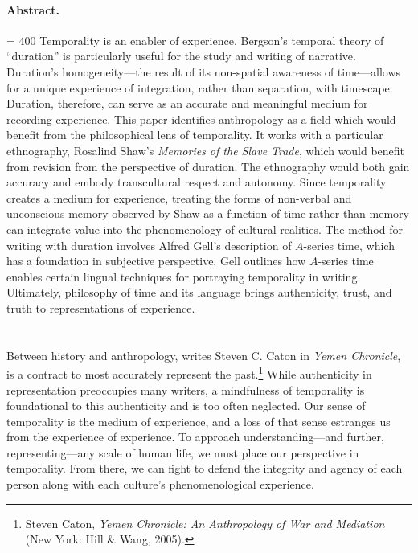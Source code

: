 \paragraph{\small Abstract.}
\pretolerance = 400
{
\small
Temporality is an enabler of experience. Bergson's temporal theory of
``duration'' is particularly useful for the study and writing of
narrative. Duration's homogeneity---the result of its non-spatial
awareness of time---allows for a unique experience of integration,
rather than separation, with timescape. Duration, therefore, can serve
as an accurate and meaningful medium for recording experience. This
paper identifies anthropology as a field which would benefit from the
philosophical lens of temporality. It works with a particular
ethnography, Rosalind Shaw's \emph{Memories of the Slave Trade}, which
would benefit from revision from the perspective of duration. The
ethnography would both gain accuracy and embody transcultural respect
and autonomy. Since temporality creates a medium for experience,
treating the forms of non-verbal and unconscious memory observed by Shaw
as a function of time rather than memory can integrate value into the
phenomenology of cultural realities. The method for writing with
duration involves Alfred Gell's description of $A$-series time, which has
a foundation in subjective perspective. Gell outlines how $A$-series time
enables certain lingual techniques for portraying temporality in
writing. Ultimately, philosophy of time and its language brings
authenticity, trust, and truth to representations of experience.
}

\section*{}
Between history and anthropology, writes Steven C. Caton in \emph{Yemen
Chronicle}, is a contract to most accurately represent the
past.\footnote{Steven Caton, \emph{Yemen Chronicle: An Anthropology of
  War and Mediation} (New York: Hill \& Wang, 2005).} While authenticity
in representation preoccupies many writers, a mindfulness of temporality
is foundational to this authenticity and is too often neglected. Our
sense of temporality is the medium of experience, and a loss of that
sense estranges us from the experience of experience. To approach
understanding---and further, representing---any scale of human life, we
must place our perspective in temporality. From there, we can fight to
defend the integrity and agency of each person along with each culture's
phenomenological experience.


